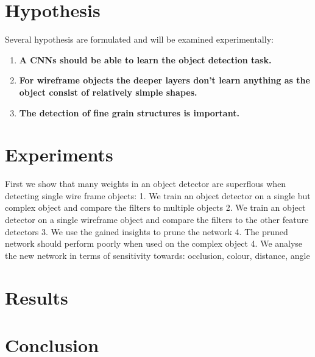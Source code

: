 

\section{Hypothesis}

Several hypothesis are formulated and will be examined experimentally:
\begin{enumerate}
	\item \textbf{A \acp{CNN} should be able to learn the object detection task.}
	\item \textbf{For wireframe objects the deeper layers don't learn anything as the object consist of relatively simple shapes.}
	\item \textbf{The detection of fine grain structures is important.}
\end{enumerate}
\newpage
\section{Experiments}

First we show that many weights in an object detector are superflous when detecting single wire frame objects:
1. We train an object detector on a single but complex object and compare the filters to multiple objects
2. We train an object detector on a single wireframe object and compare the filters to the other feature detectors
3. We use the gained insights to prune the network 
4. The pruned network should perform poorly when used on the complex object
4. We analyse the new network in terms of sensitivity towards: occlusion, colour, distance, angle

\section{Results}

\section{Conclusion}